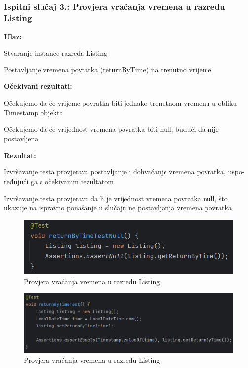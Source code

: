       

			\subsubsection{Ispitni slučaj 3.: Provjera vraćanja vremena u razredu Listing}
					\noindent\textbf{Ulaz:}
					\begin{packed_item}
						\item Stvaranje instance razreda Listing
						\item Postavljanje vremena povratka (returnByTime) na trenutno vrijeme
					\end{packed_item}
					
					\noindent\textbf{Očekivani rezultati:}
					\begin{packed_item}
						\item Očekujemo da će vrijeme povratka biti jednako trenutnom vremenu u obliku Timestamp objekta
						\item Očekujemo da će vrijednost vremena povratka biti null, budući da nije postavljena
					\end{packed_item}
					 \noindent\textbf{Rezultat:}
					\begin{packed_item}
						\item  Izvršavanje testa provjerava postavljanje i dohvaćanje vremena povratka, uspo- ređujući ga s očekivanim rezultatom
						\item  Izvršavanje testa provjerava da li je vrijednost vremena povratka null, što ukazuje na ispravno ponašanje u slučaju ne postavljanja vremena povratka
					\end{packed_item}
					
					 \begin{figure} [H]
						\centering
						\includegraphics[width=0.7\linewidth]{slike/ListingTest.png}
						\caption{Provjera vraćanja vremena u razredu Listing}
						\label{fig:Provjera vraćanja vremena u razredu Listing}
					\end{figure}
					 \begin{figure} [H]
						\centering
						\includegraphics[width=0.7\linewidth]{slike/ListingTest1.png}
						\caption{Provjera vraćanja vremena u razredu Listing}
						\label{fig:Provjera vraćanja vremena u razredu Listing}
					\end{figure}


